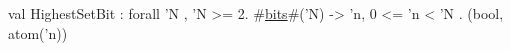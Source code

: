 val HighestSetBit : forall 'N , 'N >= 2. #\hyperref[zbits]{bits}#('N) -> {'n, 0 <= 'n < 'N . (bool, atom('n))}
